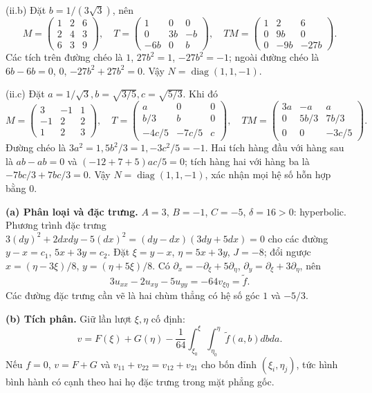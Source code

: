 (ii.b) Đặt $b=1/(3\sqrt3)$, nên
\[M=\begin{pmatrix}1&2&6\\2&4&3\\6&3&9\end{pmatrix},\quad
T=\begin{pmatrix}1&0&0\\0&3b&-b\\-6b&0&b\end{pmatrix},\quad
TM=\begin{pmatrix}1&2&6\\0&9b&0\\0&-9b&-27b\end{pmatrix}.\]
Các tích trên đường chéo là $1$, $27b^2=1$, $-27b^2=-1$; ngoài đường chéo là $6b-6b=0$, $0$, $-27b^2+27b^2=0$. Vậy $N=\operatorname{diag}(1,1,-1)$.

(ii.c) Đặt $a=1/\sqrt3,b=\sqrt{3/5},c=\sqrt{5/3}$. Khi đó
\[M=\begin{pmatrix}3&-1&1\\-1&2&2\\1&2&3\end{pmatrix},\quad
T=\begin{pmatrix}a&0&0\\b/3&b&0\\-4c/5&-7c/5&c\end{pmatrix},\quad
TM=\begin{pmatrix}3a&-a&a\\0&5b/3&7b/3\\0&0&-3c/5\end{pmatrix}.\]
Đường chéo là $3a^2=1,5b^2/3=1,-3c^2/5=-1$. Hai tích hàng đầu với hàng sau là $ab-ab=0$ và $(-12+7+5)ac/5=0$; tích hàng hai với hàng ba là $-7bc/3+7bc/3=0$. Vậy $N=\operatorname{diag}(1,1,-1)$, xác nhận mọi hệ số hỗn hợp bằng $0$.

\textbf{(a) Phân loại và đặc trưng.} $A=3$, $B=-1$, $C=-5$, $\delta=16>0$: hyperbolic. Phương trình đặc trưng $3(dy)^2+2dxdy-5(dx)^2=(dy-dx)(3dy+5dx)=0$ cho các đường $y-x=c_1$, $5x+3y=c_2$. Đặt $\xi=y-x$, $\eta=5x+3y$, $J=-8$; đổi ngược $x=(\eta-3\xi)/8$, $y=(\eta+5\xi)/8$. Có $\partial_x=-\partial_\xi+5\partial_\eta$, $\partial_y=\partial_\xi+3\partial_\eta$, nên
\[3u_{xx}-2u_{xy}-5u_{yy}=-64v_{\xi\eta}=\widetilde f.\]
Các đường đặc trưng cần vẽ là hai chùm thẳng có hệ số góc $1$ và $-5/3$.

\textbf{(b) Tích phân.} Giữ lần lượt $\xi,\eta$ cố định:
\[v=F(\xi)+G(\eta)-\frac1{64}\int_{\xi_0}^{\xi}\int_{\eta_0}^{\eta}\widetilde f(a,b)dbda.\]
Nếu $f=0$, $v=F+G$ và $v_{11}+v_{22}=v_{12}+v_{21}$ cho bốn đỉnh $(\xi_i,\eta_j)$, tức hình bình hành có cạnh theo hai họ đặc trưng trong mặt phẳng gốc.

